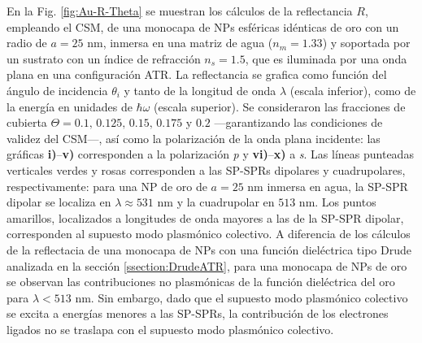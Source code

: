 En la Fig.  \ref{fig:Au-R-Theta} se muestran los cálculos de la reflectancia $R$, empleando el CSM, de una monocapa de NPs esféricas idénticas de oro con un radio de $a = 25$ nm, inmersa en una matriz de agua ($n_m = 1.33$) y soportada por un sustrato con un índice de refracción $n_s = 1.5$, que es iluminada por una onda plana en una configuración ATR. La reflectancia se grafica como función del ángulo de incidencia $\theta_i$ y tanto de la longitud de onda $\lambda$ (escala inferior), como de la energía en unidades de $\hbar\omega$ (escala superior). Se consideraron las fracciones de cubierta $\Theta = 0.1,\,0.125,\,0.15,\, 0.175$ y $0.2$ ---garantizando las condiciones de validez del CSM---, así como la polarización de la onda plana incidente: las gráficas \textbf{i)}--\textbf{v)} corresponden a la polarización \emph{p} y \textbf{vi)}--\textbf{x)} a \emph{s}. Las líneas punteadas verticales verdes y rosas corresponden a las SP-SPRs dipolares y cuadrupolares, respectivamente: para una NP de oro de $a= 25$ nm inmersa en agua, la SP-SPR dipolar se localiza en $\lambda \approx 531$ nm y la cuadrupolar en $513$ nm. Los puntos amarillos, localizados a longitudes de onda mayores a las de la SP-SPR dipolar, corresponden al supuesto modo plasmónico colectivo. A diferencia de los cálculos de la reflectacia de una monocapa de NPs  con una función dieléctrica tipo Drude analizada en la sección \ref{ssection:DrudeATR}, para una monocapa de NPs de oro se observan las contribuciones no plasmónicas de la función dieléctrica del oro para $\lambda<513$ nm. Sin embargo, dado que el supuesto modo plasmónico colectivo se excita a energías menores a las  SP-SPRs, la contribución de los electrones ligados no se traslapa con el supuesto modo plasmónico colectivo. 

